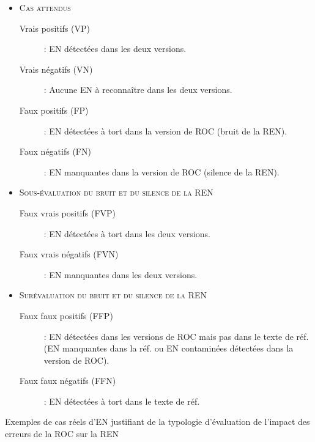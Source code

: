 \begin{itemize}
\footnotesize

	\item[] \textsc{Cas attendus}
	
	
	\begin{description}

		\item[Vrais positifs (VP)]: EN détectées dans les deux versions.
		\item[Vrais négatifs (VN)]: Aucune EN à reconnaître dans les deux versions.
		\item[Faux positifs (FP)]: EN détectées à tort dans la version de ROC (bruit de la REN).
		\item[Faux négatifs (FN)]: EN manquantes dans la version de ROC (silence de la REN).
	\end{description}
	
		
	\item[] \textsc{Sous-évaluation du bruit et du silence de la REN}
	
	
	\begin{description}
	
		\item[Faux vrais positifs (FVP)]: EN détectées à tort dans les deux versions.
	
	 	\item[Faux vrais négatifs (FVN)] : EN manquantes dans les deux versions.
	 \end{description}
	 
	 \item[] \textsc{Surévaluation du bruit et du silence de la REN}
	
	\begin{description}
	
		\item[Faux faux positifs (FFP)]: EN détectées dans les versions de ROC mais pas dans le texte de réf. (EN manquantes dans la réf. ou EN contaminées détectées dans la version de ROC).
		
 		\item[Faux faux négatifs (FFN)]: EN  détectées à tort dans le texte de réf.

	\end{description}

\end{itemize}

\begin{table}[h!]
    \centering
    

    \caption{Exemples de cas réels d'EN justifiant de la typologie d'évaluation de l'impact des erreurs de la ROC sur la REN}
    \label{tab:typo_eval}
\end{table}

